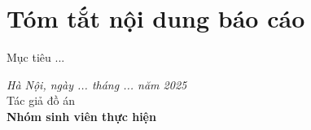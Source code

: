\chapter*{Tóm tắt nội dung báo cáo}

Mục tiêu ...

\vspace{-3mm}
\hspace{0.5\textwidth}
\begin{minipage}{0.5\textwidth}
	\noindent\begin{center}
		\vspace{1cm}
		\textit{Hà Nội, ngày ... tháng ... năm 2025} \\
		Tác giả đồ án\\ \vspace{1.5cm}
		\textbf{Nhóm sinh viên thực hiện}
	\end{center}	
\end{minipage}

